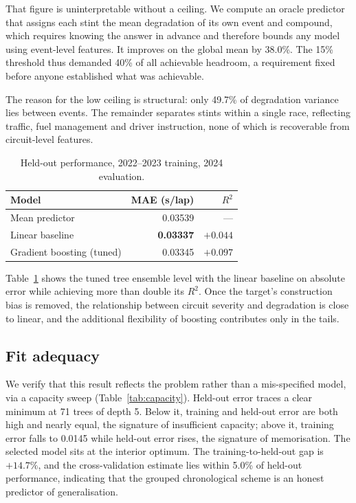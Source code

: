 \documentclass[conference]{IEEEtran}
\begin{document}
That figure is uninterpretable without a ceiling. We compute an oracle
predictor that assigns each stint the mean degradation of its own event and
compound, which requires knowing the answer in advance and therefore bounds any
model using event-level features. It improves on the global mean by 38.0\%. The
15\% threshold thus demanded 40\% of all achievable headroom, a requirement
fixed before anyone established what was achievable.

The reason for the low ceiling is structural: only 49.7\% of degradation
variance lies between events. The remainder separates stints within a single
race, reflecting traffic, fuel management and driver instruction, none of which
is recoverable from circuit-level features.

\begin{table}[t]
\caption{Held-out performance, 2022--2023 training, 2024 evaluation.}
\label{tab:results}
\centering
\begin{tabular}{lrr}
\toprule
Model & MAE (s/lap) & $R^2$ \\
\midrule
Mean predictor & 0.03539 & --- \\
Linear baseline & \textbf{0.03337} & $+0.044$ \\
Gradient boosting (tuned) & 0.03345 & \textbf{$+0.097$} \\
\bottomrule
\end{tabular}
\end{table}

Table~\ref{tab:results} shows the tuned tree ensemble level with the linear
baseline on absolute error while achieving more than double its $R^2$. Once the
target's construction bias is removed, the relationship between circuit
severity and degradation is close to linear, and the additional flexibility of
boosting contributes only in the tails.

\subsection{Fit adequacy}

We verify that this result reflects the problem rather than a mis-specified
model, via a capacity sweep (Table~\ref{tab:capacity}). Held-out error traces a
clear minimum at 71 trees of depth 5. Below it, training and held-out error are
both high and nearly equal, the signature of insufficient capacity; above it,
training error falls to 0.0145 while held-out error rises, the signature of
memorisation. The selected model sits at the interior optimum. The
training-to-held-out gap is $+14.7\%$, and the cross-validation estimate lies
within 5.0\% of held-out performance, indicating that the grouped chronological
scheme is an honest predictor of generalisation.
\end{document}
